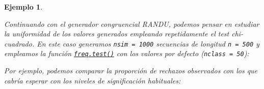\documentclass[
  spanish,
  10pt,
]{book}
\newenvironment{Shaded}{\begin{snugshade}}{\end{snugshade}}
\newcommand{\AttributeTok}[1]{\textcolor[rgb]{0.13,0.29,0.53}{#1}}
\newcommand{\CommentTok}[1]{\textcolor[rgb]{0.56,0.35,0.01}{\textit{#1}}}
\newcommand{\ControlFlowTok}[1]{\textcolor[rgb]{0.13,0.29,0.53}{\textbf{#1}}}
\newcommand{\DecValTok}[1]{\textcolor[rgb]{0.00,0.00,0.81}{#1}}
\newcommand{\FunctionTok}[1]{\textcolor[rgb]{0.13,0.29,0.53}{\textbf{#1}}}
\newcommand{\NormalTok}[1]{#1}
\newcommand{\OtherTok}[1]{\textcolor[rgb]{0.56,0.35,0.01}{#1}}
\newcommand{\SpecialCharTok}[1]{\textcolor[rgb]{0.81,0.36,0.00}{\textbf{#1}}}
\newcommand{\StringTok}[1]{\textcolor[rgb]{0.31,0.60,0.02}{#1}}
\theoremstyle{break}
\newtheorem{example}{Ejemplo}[chapter]
\theoremstyle{nonumberplain}
\renewcommand{\CommentTok}[1]{\textcolor[rgb]{0.41,0.41,0.41}{\texttt{#1}}}
\begin{document}
\begin{example}
\protect\hypertarget{exm:rep-test-randu}{}\label{exm:rep-test-randu}

Continuando con el generador congruencial RANDU, podemos pensar en estudiar la uniformidad de los valores generados empleando repetidamente el test chi-cuadrado.
En este caso generamos \texttt{nsim\ =\ 1000} secuencias de longitud \texttt{n\ =\ 500} y empleamos la función \href{https://rubenfcasal.github.io/simres/reference/freq.test.html}{\texttt{freq.test()}} con los valores por defecto (\texttt{nclass\ =\ 50}):

\begin{Shaded}
\end{Shaded}

Por ejemplo, podemos comparar la proporción de rechazos observados con los que cabría esperar con los niveles de significación habituales:


\end{example}
\end{document}
